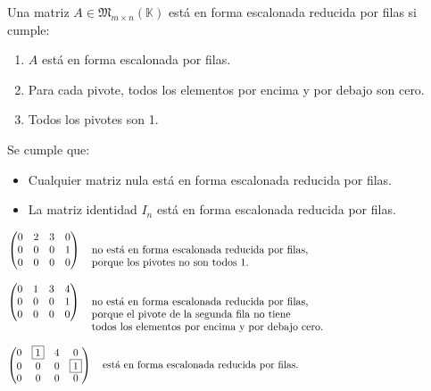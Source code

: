 \documentclass[a4paper,12pt]{article}
\begin{document}
\begin{procedimiento}[title=Forma escalonada reducida por filas]
Una matriz $A \in \mathfrak{M}_{m \times n}(\mathbb{K})$ está en forma escalonada reducida por filas si cumple:
\begin{enumerate}
\item $A$ está en forma escalonada por filas.
\item Para cada pivote, todos los elementos por encima y por debajo son cero.
\item Todos los pivotes son 1.
\end{enumerate}

Se cumple que:
\begin{itemize}
\item Cualquier matriz nula está en forma escalonada reducida por filas.
\item La matriz identidad $I_n$ está en forma escalonada reducida por filas.
\end{itemize}
\end{procedimiento}

\begin{ejemplo}[title=Ejemplos de forma escalonada reducida por filas]

\[
\begin{pmatrix}
0 & 2 & 3 & 0 \\
0 & 0 & 0 & 1 \\
0 & 0 & 0 & 0
\end{pmatrix}
\quad
\text{\parbox[t]{1\textwidth}{no está en forma escalonada reducida por filas, \\ porque los pivotes no son todos 1.}}
\]

\[
\begin{pmatrix}
0 & 1 & 3 & 4 \\
0 & 0 & 0 & 1 \\
0 & 0 & 0 & 0
\end{pmatrix}
\quad
\text{\parbox[t]{1\textwidth}{no está en forma escalonada reducida por filas, \\ porque el pivote de la segunda fila no tiene \\ todos los elementos por encima y por debajo cero.}}
\]

\[
\begin{pmatrix}
0 & \boxed{1} & 4 & 0 \\
0 & 0 & 0 & \boxed{1} \\
0 & 0 & 0 & 0
\end{pmatrix}
\quad
\text{\parbox[t]{1\textwidth}{está en forma escalonada reducida por filas.}}
\]

\end{ejemplo}
\end{document}

